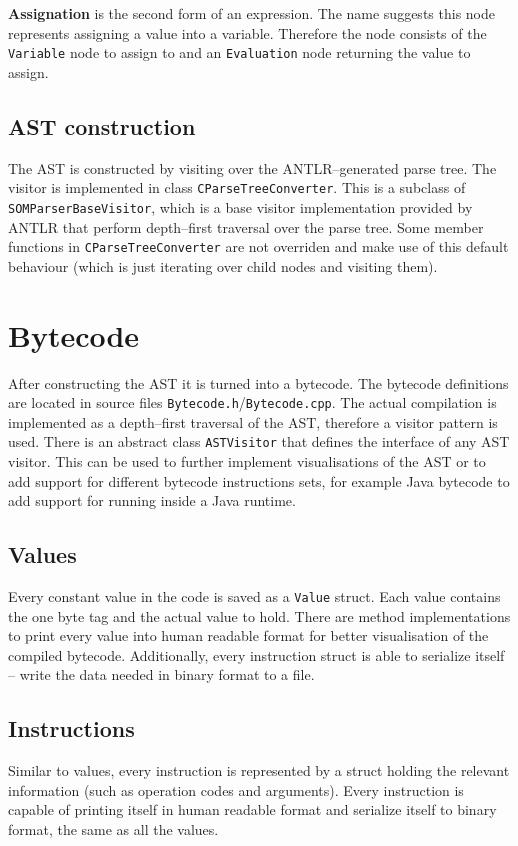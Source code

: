 \documentclass[thesis=M,english]{FITthesis}[2019/12/23]
\begin{document}
\textbf{Assignation} is the second form of an expression. The name suggests this node represents assigning a value into a variable. Therefore the node consists
of the \texttt{Variable} node to assign to and an \texttt{Evaluation} node returning the value to assign.

\subsection{AST construction}
The AST is constructed by visiting over the ANTLR--generated parse tree. The visitor is implemented in class \texttt{CParseTreeConverter}. This is a subclass
of \texttt{SOMParserBaseVisitor}, which is a base visitor implementation provided by ANTLR that perform depth--first traversal over the parse tree. Some member
functions in \texttt{CParseTreeConverter} are not overriden and make use of this default behaviour (which is just iterating over child nodes and visiting them).

\section{Bytecode}
After constructing the AST it is turned into a bytecode. The bytecode definitions are located in source files \texttt{Bytecode.h}/\texttt{Bytecode.cpp}. The actual
compilation is implemented as a depth--first traversal of the AST, therefore a visitor pattern is used. There is an abstract class \texttt{ASTVisitor} that defines
the interface of any AST visitor. This can be used to further implement visualisations of the AST or to add support for different bytecode instructions sets,
for example Java bytecode to add support for running inside a Java runtime.

\subsection{Values}
Every constant value in the code is saved as a \texttt{Value} struct. Each value contains the one byte tag and the actual value to hold. There are method implementations
to print every value into human readable format for better visualisation of the compiled bytecode. Additionally, every instruction struct is able to serialize itself -- 
write the data needed in binary format to a file.

\subsection{Instructions}
Similar to values, every instruction is represented by a struct holding the relevant information (such as operation codes and arguments). Every instruction is capable
of printing itself in human readable format and serialize itself to binary format, the same as all the values.
\end{document}
